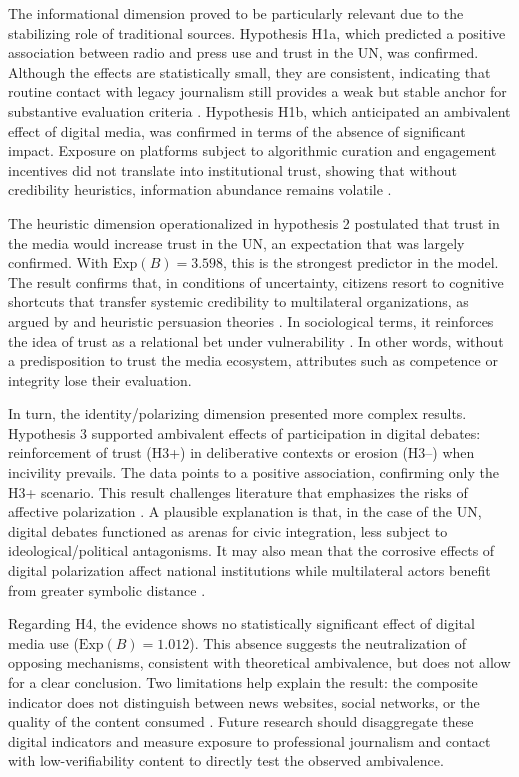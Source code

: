 \documentclass[english]{textolivre}
\begin{document}
The informational dimension proved to be particularly relevant due to the stabilizing role of traditional sources. Hypothesis H1a, which predicted a positive association between radio and press use and trust in the UN, was confirmed. Although the effects are statistically small, they are consistent, indicating that routine contact with legacy journalism still provides a weak but stable anchor for substantive evaluation criteria \cite{devreese2005}. Hypothesis H1b, which anticipated an ambivalent effect of digital media, was confirmed in terms of the absence of significant impact. Exposure on platforms subject to algorithmic curation and engagement incentives did not translate into institutional trust, showing that without credibility heuristics, information abundance remains volatile \cite{bucher2018, vosoughi2018}.

The heuristic dimension operationalized in hypothesis 2 postulated that trust in the media would increase trust in the UN, an expectation that was largely confirmed. With $\text{Exp}(B)=3.598$, this is the strongest predictor in the model. The result confirms that, in conditions of uncertainty, citizens resort to cognitive shortcuts that transfer systemic credibility to multilateral organizations, as argued by \textcite{sundar2008} and heuristic persuasion theories \cite{chaiken1987}. In sociological terms, it reinforces the idea of trust as a relational bet under vulnerability \cite{levi2000, hardin2002trust}. In other words, without a predisposition to trust the media ecosystem, attributes such as competence or integrity lose their evaluation.

In turn, the identity/polarizing dimension presented more complex results. Hypothesis 3 supported ambivalent effects of participation in digital debates: reinforcement of trust (H3+) in deliberative contexts or erosion (H3–) when incivility prevails. The data points to a positive association, confirming only the H3+ scenario. This result challenges literature that emphasizes the risks of affective polarization \cite{stroud2010, bail2018}. A plausible explanation is that, in the case of the UN, digital debates functioned as arenas for civic integration, less subject to ideological/political antagonisms. It may also mean that the corrosive effects of digital polarization affect national institutions while multilateral actors benefit from greater symbolic distance \cite{mutz2006}.

Regarding H4, the evidence shows no statistically significant effect of digital media use ($\text{Exp}(B) = 1.012$). This absence suggests the neutralization of opposing mechanisms, consistent with theoretical ambivalence, but does not allow for a clear conclusion. Two limitations help explain the result: the composite indicator does not distinguish between news websites, social networks, or the quality of the content consumed \cite{gillespie2018}. Future research should disaggregate these digital indicators and measure exposure to professional journalism and contact with low-verifiability content to directly test the observed ambivalence.
\end{document}
